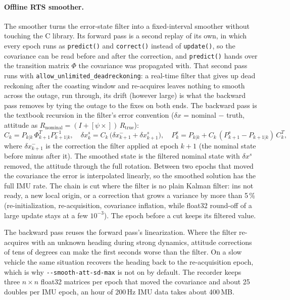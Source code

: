\documentclass[11pt,a4paper]{article}
\newcommand{\code}[1]{\texttt{#1}}
\begin{document}
\paragraph{Offline RTS smoother.}
The smoother turns the error-state filter into a fixed-interval smoother
\cite{rauch1965} without touching the C library. Its forward pass is a second replay of its
own, in which every epoch runs as \code{predict()} and \code{correct()}
instead of \code{update()}, so the covariance can be read before and after
the correction, and \code{predict()} hands over the transition matrix
$\Phi$ the covariance was propagated with. That second pass runs with
\code{allow\_\allowbreak{}unlimited\_\allowbreak{}deadreckoning}: a real-time filter that
gives up dead reckoning after the coasting window and re-acquires leaves
nothing to smooth across the outage, run through, its drift (however large)
is what the backward pass removes by tying the outage to the fixes on both
ends. The backward pass is the textbook recursion
\cite{rauch1965,groves2013} in the filter's error
convention ($\delta x$ = nominal $-$ truth, attitude as
$R_\text{nominal} = (I + [\psi\times])\,R_\text{true}$):
\[
  C_k = P_{k|k}\,\Phi_{k+1}^T P_{k+1|k}^{-1},\quad
  \delta x^s_k = C_k\,\bigl(\delta x^-_{k+1} + \delta x^s_{k+1}\bigr),\quad
  P^s_k = P_{k|k} + C_k\,(P^s_{k+1} - P_{k+1|k})\,C_k^T,
\]
where $\delta x^-_{k+1}$ is the correction the filter applied at epoch $k+1$
(the nominal state before minus after it). The smoothed state is the
filtered nominal state with $\delta x^s$ removed, the attitude through the
full rotation. Between two epochs that moved the covariance the error is
interpolated linearly, so the smoothed solution has the full IMU rate. The
chain is cut where the filter is no plain Kalman filter: ins not ready, a
new local origin, or a correction that grows a variance by more than
5\,\% (re-initialization, re-acquisition, covariance inflation, while
float32 round-off of a large update stays at a few $10^{-3}$). The epoch
before a cut keeps its filtered value.

The backward pass reuses the forward pass's linearization. Where the filter
re-acquires with an unknown heading during strong dynamics, attitude
corrections of tens of degrees can make the first seconds worse than the
filter. On a slow vehicle the same situation recovers the heading back to
the re-acquisition epoch, which is why \code{-{}-smooth-att-sd-max} is not
on by default. The recorder keeps three $n\times n$ float32 matrices per
epoch that moved the covariance and about 25 doubles per IMU epoch, an
hour of 200\,Hz IMU data takes about 400\,MB.
\end{document}

